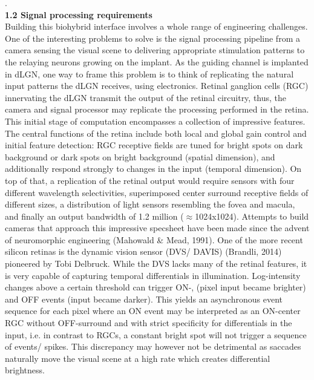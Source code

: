 \documentclass[8pt]{beamer}
\begin{document}
\begin{small}
	\tiny .\\
	\selectfont
	\small
	\textbf{1.2 Signal processing requirements} \\ 
	Building this biohybrid interface involves a whole range of engineering
	challenges. One of the interesting problems to solve is the signal
	processing pipeline from a camera sensing the visual scene to delivering
	appropriate stimulation patterns to the relaying neurons growing on the
	implant. As the guiding channel is implanted in dLGN, one way to frame this
	problem is to think of replicating the natural input patterns the dLGN
	receives, using electronics. Retinal ganglion cells (RGC) innervating the
	dLGN transmit the output of the retinal circuitry, thus, the camera and
	signal processor may replicate the processing performed in the retina. This
	initial stage of computation encompasses a collection of impressive
	features. The central functions of the retina include both local and global
	gain control and initial feature detection: RGC receptive fields are tuned
	for bright spots on dark background or dark spots on bright background
	(spatial dimension), and additionally respond strongly to changes in the
	input (temporal dimension). On top of that, a replication of the retinal
	output would require sensors with four different wavelength selectivities,
	superimposed center surround receptive fields of different sizes, a
	distribution of light sensors resembling the fovea and macula, and finally
	an output bandwidth of 1.2 million ($\approx$1024x1024). Attempts to build
	cameras that approach this impressive specsheet have been made since the
	advent of neuromorphic engineering (Mahowald \& Mead, 1991). One of the more
	recent silicon retinas is the dynamic vision sensor (DVS/ DAVIS) (Brandli,
	2014) pioneered by Tobi Delbruck. While the DVS lacks many of the retinal
	features, it is very capable of capturing temporal differentials in
	illumination. Log-intensity changes above a certain threshold can trigger
	ON-, (pixel input became brighter) and OFF events (input became darker).
	This yields an asynchronous event sequence for each pixel where an ON event
	may be interpreted as an ON-center RGC without OFF-surround and with strict
	specificity for differentials in the input, i.e. in contrast to RGCs, a
	constant bright spot will not trigger a sequence of events/ spikes. This
	discrepancy may however not be detrimental as saccades naturally move the
	visual scene at a high rate which creates differential brightness. \\ \vspace{.1cm}  

\end{small}
\end{document}
